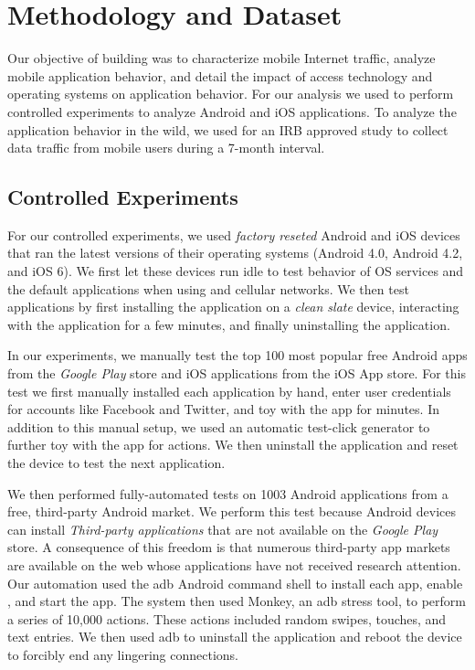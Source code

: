 \section{Methodology and Dataset}
\label{sec:Methodology}

Our objective of building \platname was to characterize mobile Internet traffic, analyze mobile application behavior, and detail the impact of access technology and operating systems on application behavior. 
For our analysis we used \platname to perform controlled experiments to analyze Android and iOS applications.
To analyze the application behavior in the wild, we used \platname for an IRB approved study to collect data traffic from mobile users during a 7-month interval.

\subsection{Controlled Experiments}

For our controlled experiments, we used \emph{factory reseted} Android and iOS devices that ran the latest versions of their operating systems (Android 4.0, Android 4.2, and iOS 6). 
We first let these devices run idle to test behavior of OS services and the default applications when using \wifi and cellular networks.
We then test applications by first installing the application on a \emph{clean slate} device, interacting with the application for a few minutes, and finally uninstalling the  application. 

In our experiments, we manually test the top 100 most popular free Android apps from the \emph{Google Play} store and \tbd{} iOS applications from the iOS App store.
For this test we first manually installed each application by hand, enter user credentials for accounts like Facebook and Twitter, and toy with the app for \tbd{} minutes. 
In addition to this manual setup, we used an automatic test-click generator to further toy with the app for \tbd{} actions. 
We then uninstall the application and reset the device to test the next application. 

We then performed fully-automated tests on 1003 Android applications from a free, third-party Android market.
We perform this test because Android devices can install \emph{Third-party applications} that are not available on the \emph{Google Play} store.
A consequence of this freedom is that numerous third-party app markets are available on the web whose applications have not received research attention.
Our automation used the adb Android command shell to install each app, enable \platname, and start the app.
The system then used Monkey, an adb stress tool, to perform a series of 10,000 actions. 
These actions included random swipes, touches, and text entries.
We then used adb to uninstall the application and reboot the device to forcibly end any lingering connections.

